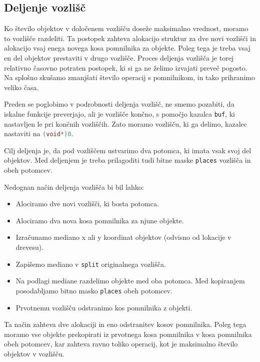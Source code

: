 \documentclass[a4paper,12pt]{article}
\begin{document}
\subsection{Deljenje vozlišč}
Ko število objektov v določenem vozlišču doseže maksimalno vrednost, moramo to vozlišče
razdeliti. Ta postopek zahteva alokacijo struktur za dve novi vozlišči in alokacijo vsaj enega novega
kosa pomnilnika za objekte. Poleg tega je treba vsaj en del objektov prestaviti v drugo vozlišče.
Proces deljenja vozlišča je torej relativno časovno potraten postopek, ki si ga ne želimo izvajati
preveč pogosto. Na splošno skušamo zmanjšati število operacij s pomnilnikom, in tako prihranimo veliko
časa.

Preden se poglobimo v podrobnosti deljenja vozlišč, ne smemo pozabiti, da iskalne funkcije preverjajo,
ali je vozlišče končno, s pomočjo kazalca \lstinline|buf|, ki nastavljen le pri končnih vozliščih. 
Zato moramo vozlišču, ki ga delimo, kazalec nastaviti na \lstinline[language=C]|(void*)0|.

Cilj deljenja je, da pod vozliščem ustvarimo dva potomca, ki imata vsak svoj del objektov. Med deljenjem
je treba prilagoditi tudi bitne maske \lstinline|places| vozlišča in obeh potomcev.

Nedognan način deljenja vozlišča bi bil lahko:
\begin{itemize}
    \item Alociramo dve novi vozlišči, ki bosta potomca.
    \item Alociramo dva nova kosa pomnilnika za njune objekte.
    \item Izračunamo mediano x ali y koordinat objektov (odvisno od lokacije v drevesu).
    \item Zapišemo mediano v \lstinline|split| originalnega vozlišča.
    \item Na podlagi mediane razdelimo objekte med oba potomca. Med kopiranjem
    posodabljamo bitno masko \lstinline|places| obeh potomcev.
    \item Prvotnemu vozlišču odstranimo kos pomnilnika z objekti.
\end{itemize}
Ta način zahteva dve alokaciji in eno odstranitev kosov pomnilnika. Poleg tega moramo
vse objekte prekopirati iz prvotnega kosa pomnilnika v kosa pomnilnika obeh potomcev,
kar zahteva ravno toliko operacij, kot je maksimalno število objektov v vozlišču.
\end{document}
